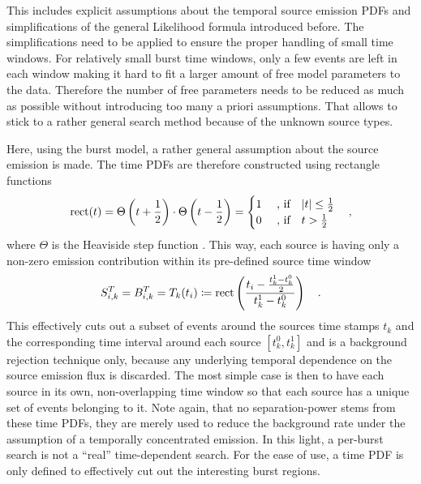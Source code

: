 This includes explicit assumptions about the temporal source emission PDFs and simplifications of the general Likelihood formula introduced before.
The simplifications need to be applied to ensure the proper handling of small time windows.
For relatively small burst time windows, only a few events are left in each window making it hard to fit a larger amount of free model parameters to the data.
Therefore the number of free parameters needs to be reduced as much as possible without introducing too many a priori assumptions.
That allows to stick to a rather general search method because of the unknown source types.

Here, using the burst model, a rather general assumption about the source emission is made.
The time PDFs are therefore constructed using rectangle functions
\begin{equation}
  \operatorname{rect}(t)
  = \Theta\left(t+\frac{1}{2}\right) \cdot \Theta\left(t-\frac{1}{2}\right)
  = \begin{cases}
      1 &\text{ , if}\quad |t| \leq \frac{1}{2} \\
      0 &\text{ , if}\quad  t    >  \frac{1}{2} \\
    \end{cases}
  \quad\text{,}
\end{equation}
where $\Theta$ is the Heaviside step function \cite{Abramowitz:1974handbook}.
This way, each source is having only a non-zero emission contribution within its pre-defined source time window
\begin{equation}
  \label{equ:time_window_def}
  S_{i,k}^T = B_{i,k}^T = T_k(t_i) \coloneqq
    \operatorname{rect}\left(\frac{t_i - \frac{t_k^1-t_k^0}{2}}
                              {t_k^1-t_k^0}\right)
  \quad\text{.}
\end{equation}
This effectively cuts out a subset of events around the sources time stamps $t_k$ and the corresponding time interval around each source $[t_k^0, t_k^1]$ and is a background rejection technique only, because any underlying temporal dependence on the source emission flux is discarded.
The most simple case is then to have each source in its own, non-overlapping time window so that each source has a unique set of events belonging to it.
Note again, that no separation-power stems from these time PDFs, they are merely used to reduce the background rate under the assumption of a temporally concentrated emission.
In this light, a per-burst search is not a \enquote{real} time-dependent search.
For the ease of use, a time PDF is only defined to effectively cut out the interesting burst regions.

